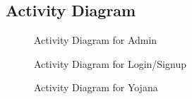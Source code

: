 \documentclass[conference]{IEEEtran}
\begin{document}
\subsection{Activity Diagram}
\begin{figure}[h!]
\centering
{}
\caption{Activity Diagram for Admin}
\end{figure}
\begin{figure}[h!]
\centering
{}
\caption{Activity Diagram for Login/Signup}
\end{figure}
\begin{figure}[h!]
\centering
{}
\caption{Activity Diagram for Yojana}
\end{figure}
\newpage
\end{document}
